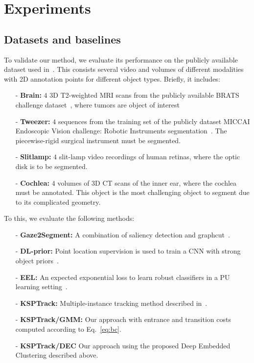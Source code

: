 \section{Experiments}
\label{sec:experiments}

\subsection{Datasets and baselines}
\label{sec:data}
To validate our method, we evaluate its performance on the publicly available dataset used in~\cite{lejeune18}. This consists several video and volumes of different modalities with 2D annotation points for different object types. Briefly, it includes:
\begin{itemize}
\item[-]{\bf{Brain:}} $4$ 3D T2-weighted MRI scans from the publicly available BRATS challenge dataset~\cite{menze15}, where tumors are object of interest
\item[-]{\bf{Tweezer:}} $4$ sequences from the training set of the publicly dataset MICCAI Endoscopic Vision challenge: Robotic Instruments segmentation~\cite{endochal}. The piecewise-rigid surgical instrument must be segmented.
  
\item[-]{\bf{Slitlamp:}} $4$ slit-lamp video recordings of human retinas, where the optic disk is to be segmented. 

\item[-]{\bf{Cochlea:}} $4$ volumes of 3D CT scans of the inner ear, where the cochlea must be annotated. This object is the most challenging object to segment due to its complicated geometry. 
\end{itemize}

To this, we evaluate the following methods:
\begin{itemize}
\item[-]{\bf Gaze2Segment:} A combination of saliency detection and graphcut~\cite{khosravan16}. 
\item[-]{\bf DL-prior:} Point location supervision is used to train a CNN with strong object priors~\cite{bearman16}.
\item[-]{\bf EEL:} An expected exponential loss to learn robust classifiers in a PU learning setting~\cite{lejeune17}. 
\item[-]{\bf KSPTrack:} Multiple-instance tracking method described in~\cite{lejeune18}. 
\item[-]{\bf KSPTrack/GMM:} Our approach with entrance and transition costs computed according to Eq.~\eqref{eq:bc}.
\item[-]{\bf KSPTrack/DEC} Our approach using the proposed Deep Embedded Clustering described above.
\end{itemize}

